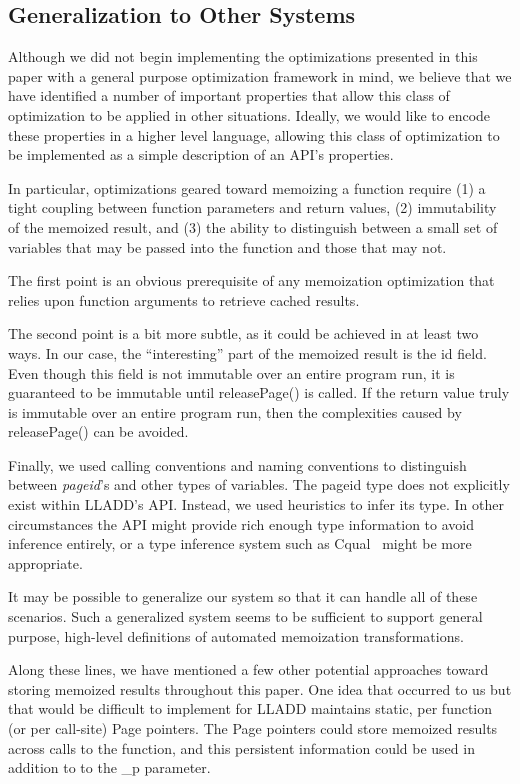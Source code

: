 \documentclass[10pt,letterpaper,twocolumn,english]{article}
\newcommand{\yad}{LLADD\xspace}
\newcommand{\unpin}{releasePage()\xspace}
\newcommand{\PP}{\_p\xspace}
\begin{document}
\subsection{Generalization to Other Systems}
Although we did not begin implementing the optimizations presented in
this paper with a general purpose optimization framework in mind, we believe that we
have identified a number of important properties that allow this class
of optimization to be applied in other situations.  Ideally, we would like to encode
these properties in a higher level language, allowing this class of 
optimization to be implemented as a simple description of an API's properties.

In particular, optimizations geared toward memoizing a function require
(1) a tight coupling between function parameters and return values,
(2) immutability of the memoized result, and (3) the ability to distinguish
between a small set of variables that may be passed into the function
and those that may not.

The first point is an obvious prerequisite of any memoization
optimization that relies upon function arguments to retrieve cached
results.  

The second point is a bit more subtle, as it could be
achieved in at least two ways.  In our case, the ``interesting'' part of the
memoized result is the id field.  Even
though this field is not immutable over an entire program run, it is
guaranteed to be immutable until \unpin is called.  If the return
value truly is immutable over an entire program run, then the
complexities caused by \unpin can be avoided.

Finally, we used calling conventions and naming conventions to
distinguish between {\em pageid}'s and other types of variables.  The
pageid type does not explicitly exist within \yad's API.  Instead, we
used heuristics to infer its type.  In other circumstances the API
might provide rich enough type information to avoid inference
entirely, or a type inference system such as Cqual~\cite{cqual} might be more
appropriate.

It may be possible to generalize our system so that it can handle all
of these scenarios.  Such a generalized system seems to be sufficient
to support general purpose, high-level definitions of automated
memoization transformations.

Along these lines, we have mentioned a few other potential approaches
toward storing memoized results throughout this paper.  One idea that
occurred to us but that would be difficult to implement for \yad
maintains static, per function (or per call-site) Page pointers.  The
Page pointers could store memoized results across calls to the
function, and this persistent information could be used in addition to to
the \PP parameter.
\end{document}
